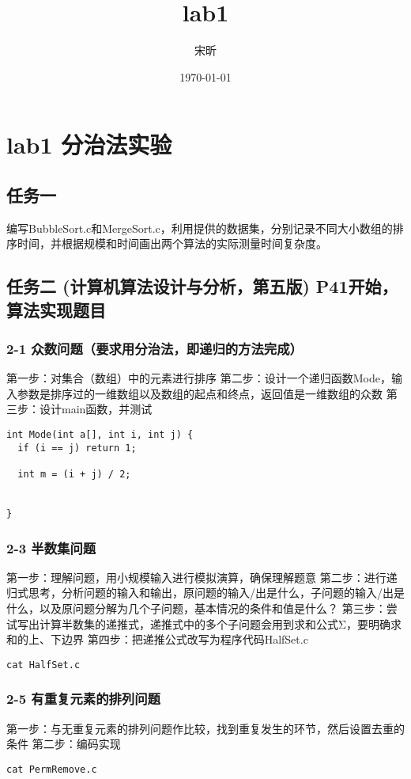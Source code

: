 \documentclass[11pt]{article}
\author{宋昕}
\date{\today}
\title{lab1}
\begin{document}
\maketitle
\tableofcontents

\section{lab1 分治法实验}
\label{sec-1}
\subsection{任务一}
\label{sec-1-1}
编写BubbleSort.c和MergeSort.c，利用提供的数据集，分别记录不同大小数组的排序时间，并根据规模和时间画出两个算法的实际测量时间复杂度。
\subsection{任务二 (计算机算法设计与分析，第五版) P41开始，算法实现题目}
\label{sec-1-2}
\subsubsection{2-1 众数问题（要求用分治法，即递归的方法完成）}
\label{sec-1-2-1}
第一步：对集合（数组）中的元素进行排序
第二步：设计一个递归函数Mode，输入参数是排序过的一维数组以及数组的起点和终点，返回值是一维数组的众数
第三步：设计main函数，并测试
\begin{verbatim}
int Mode(int a[], int i, int j) {
  if (i == j) return 1;
  
  int m = (i + j) / 2;


}
\end{verbatim}
\subsubsection{2-3 半数集问题}
\label{sec-1-2-2}
第一步：理解问题，用小规模输入进行模拟演算，确保理解题意
第二步：进行递归式思考，分析问题的输入和输出，原问题的输入/出是什么，子问题的输入/出是什么，以及原问题分解为几个子问题，基本情况的条件和值是什么？
第三步：尝试写出计算半数集的递推式，递推式中的多个子问题会用到求和公式Σ，要明确求和的上、下边界
第四步：把递推公式改写为程序代码HalfSet.c

\begin{verbatim}
cat HalfSet.c
\end{verbatim}

\subsubsection{2-5 有重复元素的排列问题}
\label{sec-1-2-3}
第一步：与无重复元素的排列问题作比较，找到重复发生的环节，然后设置去重的条件
第二步：编码实现
\begin{verbatim}
cat PermRemove.c
\end{verbatim}
\end{document}
